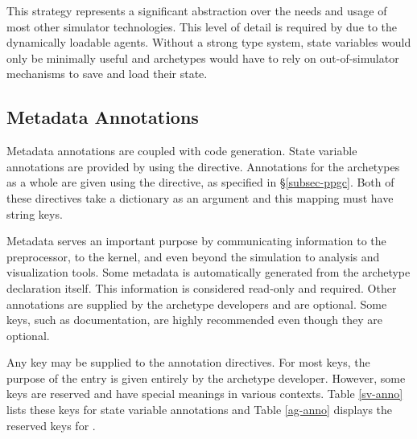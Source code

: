 This strategy represents a significant abstraction over the needs and usage of most 
other simulator technologies. This level of detail is required by \cyclus due to the
dynamically loadable agents. Without a strong type system, state variables 
would only be minimally useful and archetypes would have to rely on out-of-simulator
mechanisms to save and load their state.

\subsection{Metadata Annotations}

Metadata annotations are coupled with code generation.  State variable annotations
are provided by using the  directive. Annotations for 
the archetypes as a whole are given using the  directive,
as specified in \S \ref{subsec-ppgc}. Both of these directives take a dictionary 
as an argument and this mapping must have string keys.

Metadata serves an important purpose by communicating information to the \cyclus
preprocessor, to the \cyclus kernel, and even beyond the simulation to analysis 
and visualization tools. Some metadata is automatically generated from the 
archetype declaration itself.  This information is considered read-only and required. 
Other annotations are supplied by the archetype developers and are optional. 
Some keys, such as documentation, are highly recommended even though they 
are optional.

Any key may be supplied to the annotation directives. For most keys, the 
purpose of the entry is given entirely by the archetype developer. However, 
some keys are reserved and have special meanings in various contexts. Table
\ref{sv-anno} lists these keys for state variable annotations and Table
\ref{ag-anno} displays the reserved keys for .

